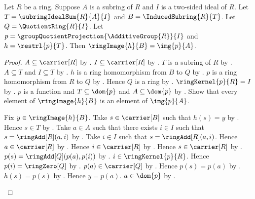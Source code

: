 \begin{theorem}\label{ring_second_isomorphism_ambient_restriction_image}
    Let $R$ be a ring.
    Suppose $A$ is a subring of $R$ and
        $I$ is a two-sided ideal of $R$.
    Let $T=\subringIdealSum{R}{A}{I}$ and
        $B=\InducedSubring{R}{T}$.
    Let $Q=\QuotientRing{R}{I}$.
    Let $p=\groupQuotientProjection{\AdditiveGroup{R}}{I}$ and
        $h=\restrl{p}{T}$.
    Then $\ringImage{h}{B}=\img{p}{A}$.
\end{theorem}
\begin{proof}
    $A\subseteq\carrier[R]$ by .
    $I\subseteq\carrier[R]$ by
        .
    $T$ is a subring of $R$ by .
    $A\subseteq T$ and $I\subseteq T$ by
        .
    $h$ is a ring homomorphism from $B$ to $Q$ by
        .
    $p$ is a ring homomorphism from $R$ to $Q$ by
        .
    Hence $Q$ is a ring by .
    $\ringKernel{p}{R}=I$ by
        .
    $p$ is a function and $T\subseteq\dom{p}$ and
        $A\subseteq\dom{p}$ by
        .
    Show that every element of $\ringImage{h}{B}$ is an element
        of $\img{p}{A}$.
    \begin{subproof}
        Fix $y\in\ringImage{h}{B}$.
        Take $s\in\carrier[B]$ such that $h(s)=y$ by
            .
        Hence $s\in T$ by .
        Take $a\in A$ such that there exists $i\in I$ such that
            $s=\ringAdd[R](a,i)$ by .
        Take $i\in I$ such that $s=\ringAdd[R](a,i)$.
        Hence $a\in\carrier[R]$ by
            .
        Hence $i\in\carrier[R]$ by
            .
        Hence $s\in\carrier[R]$ by
            .
        $p(s)=\ringAdd[Q](p(a),p(i))$ by .
        $i\in\ringKernel{p}{R}$.
        Hence $p(i)=\ringZero[Q]$ by .
        $p(a)\in\carrier[Q]$ by .
        Hence $p(s)=p(a)$ by .
        $h(s)=p(s)$ by .
        Hence $y=p(a)$.
        $a\in\dom{p}$ by .

\end{subproof}
\end{proof}
